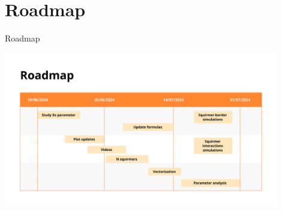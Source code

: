 \documentclass{beamer}
\begin{document}
\section{Roadmap}
\begin{frame}{Roadmap}
    \begin{center}
        \includegraphics[width=0.9\textwidth]{../images/roadmap_stage.png}
    \end{center}
\end{frame}
\end{document}
